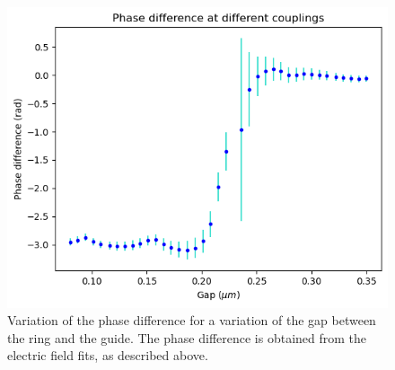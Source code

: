 \begin{figure}[H]
    \centering
    \includegraphics[width=0.7\linewidth]{Figures/ring_phase_vs_gap.png}
    \caption{Variation of the phase difference for a variation of the gap between the ring and the guide. The phase difference is obtained from the electric field fits, as described above.}
    \label{fig:ring_phase_vs_gap}
\end{figure}